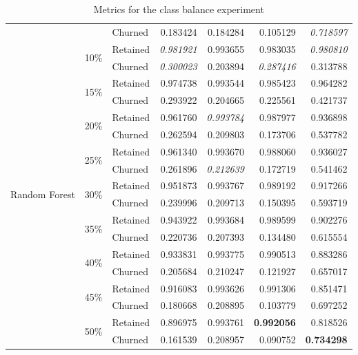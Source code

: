 \documentclass{kththesis}
\begin{document}
\begin{table}
\begin{tabular}{lllrrrr}
     &     & Churned &  0.183424 &  0.184284 &   0.105129 &  \textit{0.718597} \\
\cline{1-7}
\cline{2-7}
\multirow{18}{*}{Random Forest} & \multirow{2}{*}{10\%} & Retained &  \textit{0.981921} &  0.993655 &   0.983035 &  \textit{0.980810} \\
     &     & Churned &  \textit{0.300023} &  0.203894 &   \textit{0.287416} &  0.313788 \\
\cline{2-7}
     & \multirow{2}{*}{15\%} & Retained &  0.974738 &  0.993544 &   0.985423 &  0.964282 \\
     &     & Churned &  0.293922 &  0.204665 &   0.225561 &  0.421737 \\
\cline{2-7}
     & \multirow{2}{*}{20\%} & Retained &  0.961760 &  \textit{0.993784} &   0.987977 &  0.936898 \\
     &     & Churned &  0.262594 &  0.209803 &   0.173706 &  0.537782 \\
\cline{2-7}
     & \multirow{2}{*}{25\%} & Retained &  0.961340 &  0.993670 &   0.988060 &  0.936027 \\
     &     & Churned &  0.261896 &  \textit{0.212639} &   0.172719 &  0.541462 \\
\cline{2-7}
     & \multirow{2}{*}{30\%} & Retained &  0.951873 &  0.993767 &   0.989192 &  0.917266 \\
     &     & Churned &  0.239996 &  0.209713 &   0.150395 &  0.593719 \\
\cline{2-7}
     & \multirow{2}{*}{35\%} & Retained &  0.943922 &  0.993684 &   0.989599 &  0.902276 \\
     &     & Churned &  0.220736 &  0.207393 &   0.134480 &  0.615554 \\
\cline{2-7}
     & \multirow{2}{*}{40\%} & Retained &  0.933831 &  0.993775 &   0.990513 &  0.883286 \\
     &     & Churned &  0.205684 &  0.210247 &   0.121927 &  0.657017 \\
\cline{2-7}
     & \multirow{2}{*}{45\%} & Retained &  0.916083 &  0.993626 &   0.991306 &  0.851471 \\
     &     & Churned &  0.180668 &  0.208895 &   0.103779 &  0.697252 \\
\cline{2-7}
     & \multirow{2}{*}{50\%} & Retained &  0.896975 &  0.993761 &   \textbf{0.992056} &  0.818526 \\
     &     & Churned &  0.161539 &  0.208957 &   0.090752 &  \textbf{0.734298} \\
\bottomrule
\end{tabular}
\caption{Metrics for the class balance experiment}
\label{tab:class_balance}
\end{table}
\end{document}
